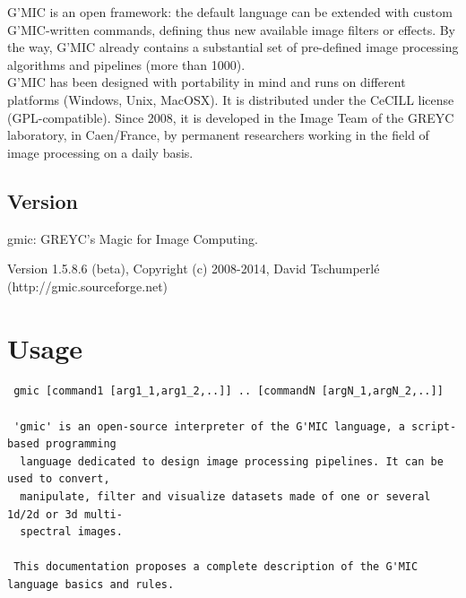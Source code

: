 \documentclass[a4paper,11pt,twoside]{book}
\begin{document}
G'MIC is an open framework: the default language can be extended with custom G'MIC-written commands, defining thus new available image filters or effects. By the way, G'MIC already contains a substantial set of pre-defined image processing algorithms and pipelines (more than 1000).\\ 
 
G'MIC has been designed with portability in mind and runs on different platforms (Windows, Unix, MacOSX). It is distributed under the CeCILL license (GPL-compatible). Since 2008, it is developed in the Image Team of the GREYC laboratory, in Caen/France, by permanent researchers working in the field of image processing on a daily basis. 
\section*{Version} 
 
 gmic: GREYC's Magic for Image Computing. 
 
        Version 1.5.8.6 (beta), Copyright (c) 2008-2014, David Tschumperl\'e 
        (http://gmic.sourceforge.net) 
\chapter{Usage} 
\small
\begin{lstlisting}
 gmic [command1 [arg1_1,arg1_2,..]] .. [commandN [argN_1,argN_2,..]] 
 
 'gmic' is an open-source interpreter of the G'MIC language, a script-based programming 
  language dedicated to design image processing pipelines. It can be used to convert, 
  manipulate, filter and visualize datasets made of one or several 1d/2d or 3d multi- 
  spectral images. 
 
 This documentation proposes a complete description of the G'MIC language basics and rules.
\end{lstlisting}
\normalsize
\end{document}
